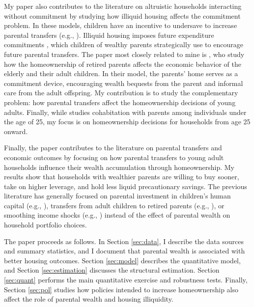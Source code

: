 \documentclass[12pt]{article}
\begin{document}
My paper also contributes to the literature on altruistic households interacting without commitment by studying how illiquid housing affects the commitment problem. In these models, children have an incentive to undersave to increase parental transfers (e.g., \citealp{Altonji1997a,Boar2018,Barczyk2014,Chu2020}). Illiquid housing imposes future expenditure commitments \citep{Chetty2007,Shore2010}, which children of wealthy parents strategically use to encourage future parental transfers. The paper most closely related to mine is \cite{Barczyk2020a}, who study how the homeownership of retired parents affects the economic behavior of the elderly and their adult children. In their model, the parents' home serves as a commitment device, encouraging wealth bequests from the parent and informal care from the adult offspring. My contribution is to study the complementary problem: how parental transfers affect the homeownership decisions of young adults. Finally, while \cite{kaplan2012moving} studies cohabitation with parents among individuals under the age of 25, my focus is on homeownership decisions for households from age 25 onward.

Finally, the paper contributes to the literature on parental transfers and economic outcomes by focusing on how parental transfers to young adult households influence their wealth accumulation through homeownership. My results show that households with wealthier parents are willing to buy sooner, take on higher leverage, and hold less liquid precautionary savings. The previous literature has generally focused on parental investment in children's human capital (e.g., \citealp{Lee2019,Daruich2018,gilraine2023public}), transfers from adult children to retired parents (e.g., \citealp{Mommaerts2016, Barczyk2018, Barczyk2020a}), or smoothing income shocks (e.g., \cite{Boar2021ReStud,fagereng2023insuring,andersen2020bailing}) instead of the effect of parental wealth on household portfolio choices.

The paper proceeds as follows. In Section \ref{sec:data}, I describe the data sources and summary statistics, and I document that parental wealth is associated with better housing outcomes. Section \ref{sec:model} describes the quantitative model, and Section \ref{sec:estimation} discusses the structural estimation. Section \ref{sec:quant} performs the main quantitative exercise and robustness tests. Finally, Section \ref{sec:pol} studies how policies intended to increase homeownership also affect the role of parental wealth and housing illiquidity.
\end{document}
